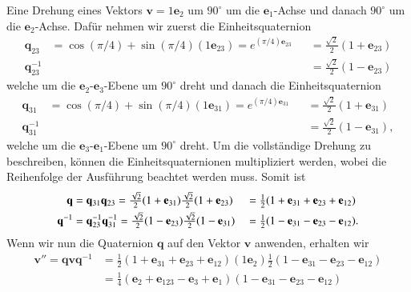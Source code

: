 \begin{beispiel}
	Eine Drehung eines Vektors $\mathbf{v}= 1\mathbf{e}_2$ um $90^\circ$ um die $\mathbf{e}_1$-Achse und danach $90^\circ$ um die $\mathbf{e}_2$-Achse.
Dafür nehmen wir zuerst die Einheitsquaternion 
	\[
	\begin{aligned}
	\mathbf{q}_{23}
	&=
	\cos(\pi/4) + \sin(\pi/4)(1\mathbf{e}_{23}) = e^{(\pi/4)\mathbf{e}_{23}}
	&
	&=
	\textstyle{\frac{\sqrt{2}}{2}}(1 + \mathbf{e}_{23})
	\\
	\mathbf{q}_{23}^{-1}
	&
	&
	&= \textstyle{\frac{\sqrt{2}}{2}} (1- \mathbf{e}_{23})
	\end{aligned}
	\]
welche um die $\mathbf{e}_{2}$-$\mathbf{e}_{3}$-Ebene um $90^\circ$ dreht und danach die Einheitsquaternion 
	\[
	\begin{aligned}
	\mathbf{q}_{31}
	&=
	\cos(\pi/4) + \sin(\pi/4)(1\mathbf{e}_{31})
	=
	e^{(\pi/4)\mathbf{e}_{31}}
	&
	&=
	\textstyle{\frac{\sqrt{2}}{2}}(1 + \mathbf{e}_{31})
	\\
	\mathbf{q}_{31}^{-1}
	&
	&
	&= \textstyle{\frac{\sqrt{2}}{2}}(1 - \mathbf{e}_{31}),
	\end{aligned}
	\]
	welche um die $\mathbf{e}_{3}$-$\mathbf{e}_{1}$-Ebene  um $90^\circ$ dreht.
Um die vollständige Drehung zu beschreiben, können die Einheitsquaternionen multipliziert werden, wobei die Reihenfolge der Ausführung beachtet werden muss.
Somit ist
\begin{align}
\label{FormelBeispielQuaternion}
\mathbf{q}
&=
\mathbf{q}_{31}\mathbf{q}_{23}
=
\textstyle{\frac{\sqrt{2}}{2}}(1 + \mathbf{e}_{31})\textstyle{\frac{\sqrt{2}}{2}}(1 + \mathbf{e}_{23})
&
&=
\textstyle{\frac{1}{2}}(1 + \mathbf{e}_{31} + \mathbf{e}_{23} + \mathbf{e}_{12})
\\
\mathbf{q}^{-1}
&=
\mathbf{q}_{23}^{-1}\mathbf{q}_{31}^{-1}
=
\textstyle{\frac{\sqrt{2}}{2}} (1- \mathbf{e}_{23})\textstyle{\frac{\sqrt{2}}{2}}(1 -\mathbf{e}_{31})
&
&=
\textstyle{\frac{1}{2}}(1 - \mathbf{e}_{31} - \mathbf{e}_{23} - \mathbf{e}_{12}).
\notag
\end{align}
	Wenn wir nun die Quaternion $\mathbf{q}$ auf den Vektor $\mathbf{v}$ anwenden, erhalten wir
	\begin{align*}
	\mathbf{v}'' = \mathbf{qvq}^{-1} &= \textstyle{\frac{1}{2}}(1 + \mathbf{e}_{31} +  \mathbf{e}_{23} +  \mathbf{e}_{12})(1\mathbf{e}_2)\textstyle{\frac{1}{2}}(1 - \mathbf{e}_{31} -  \mathbf{e}_{23} -  \mathbf{e}_{12})\\ 
	&= \textstyle{\frac{1}{4}}(\mathbf{e}_2 +  \mathbf{e}_{123} -  \mathbf{e}_3 +  \mathbf{e}_1)(1 - \mathbf{e}_{31} -  \mathbf{e}_{23} -  \mathbf{e}_{12})\\

\end{align*}
\end{beispiel}
